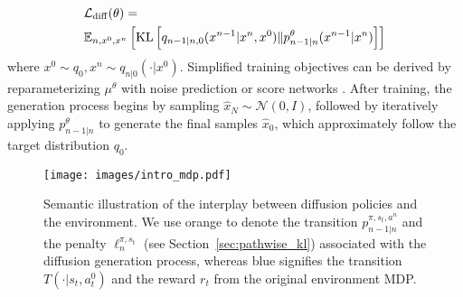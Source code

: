 \begin{equation}
\label{eq:elbo}
\begin{aligned}
    &\mathcal{L}_{\rm diff}(\theta) = \\
    &\mathbb{E}_{n,x^0,x^n}\left[\operatorname{KL}\left[q_{n-1|n,0}(x^{n-1}|x^{n},x^0)\|p^\theta_{n-1|n}(x^{n-1}|x^{n})\right]\right]
\end{aligned}
\end{equation}
where $x^0\sim q_0, x^n\sim q_{n|0}(\cdot|x^0)$. 
Simplified training objectives can be derived by reparameterizing $\mu^\theta$ with noise prediction or score networks \citep{ddpm,diffusion_sde}. 
After training, the generation process begins by sampling $\hat{x}_N \sim \mathcal{N}(0, I)$, followed by iteratively applying $p^\theta_{n-1|n}$ to generate the final samples $\hat{x}_0$, which approximately follow the target distribution $q_0$.


\begin{figure}
    \centering
    \texttt{[image: images/intro\_mdp.pdf]}
    \caption{Semantic illustration of the interplay between diffusion policies and the environment. We use orange to denote the transition $p_{n-1|n}^{\pi,s_t,a^n}$ and the penalty $\ell_{n}^{\pi,s_t}$ (see Section~\ref{sec:pathwise_kl}) associated with the diffusion generation process, whereas blue signifies the transition $T(\cdot|s_t,a_t^0)$ and the reward $r_t$ from the original environment MDP.}
    \label{fig:intro_mdp}
    \vspace{-3mm}
\end{figure}

